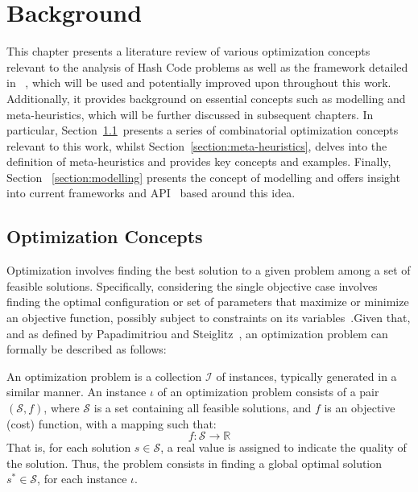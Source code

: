 \chapter{Background}
\label{chapter:background}

This chapter presents a literature review of various optimization concepts
relevant to the analysis of Hash Code problems as well as the framework detailed
in ~\cite{outeiro2021application}, which will be used and potentially improved upon throughout
this work. Additionally, it provides background on essential concepts such as modelling
and meta-heuristics, which will be further discussed in subsequent chapters.
In particular, Section~\ref{section:optimization-concepts}~presents a series
of combinatorial optimization concepts relevant to this work, whilst
Section~\ref{section:meta-heuristics}, delves into the definition of meta-heuristics
and provides key concepts and examples. Finally, Section ~\ref{section:modelling} presents
the concept of modelling and offers insight into current frameworks and
API~\cite{outeiro2021application,vieira2009uma} based around this idea.

\section{Optimization Concepts}
\label{section:optimization-concepts}

Optimization involves finding the best solution to a given problem among a set
of feasible solutions. Specifically, considering the single objective case
involves finding the optimal configuration or set of parameters that maximize or
minimize an objective function, possibly subject to constraints on its
variables~\cite{nocedal2006numerical}.Given that, and as defined by
Papadimitriou and Steiglitz~\cite{papadimitriou1998combinatorial}, an
optimization problem can formally be described as follows:

\begin{definition}
    \label{def:optimization-problem}
    An optimization problem is a collection $\mathcal{I}$ of instances,
    typically generated in a similar manner. An instance $\iota$ of an
    optimization problem consists of a pair $(\mathcal{S}, f)$, where
    $\mathcal{S}$ is a set containing all feasible solutions, and $f$ is an
    objective (cost) function, with a mapping such that:
    \begin{equation}
        \label{equation:optimization-problem}
        f \colon \mathcal{S} \longrightarrow \mathbb{R}
    \end{equation}
    That is, for each solution $s \in \mathcal{S}$, a real value is assigned to
    indicate the quality of the solution. Thus, the problem consists in finding
    a global optimal solution $s^* \in \mathcal{S}$, for each instance $\iota$.
\end{definition}

